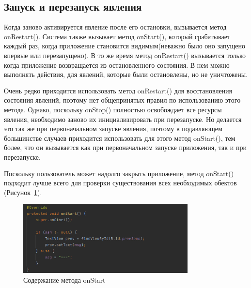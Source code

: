 \subsection{Запуск и перезапуск явления}
Когда заново активируется явление после его остановки, вызывается метод
onRestart(). Система также вызывает метод onStart(), который срабатывает
каждый раз, когда приложение становится видимым(неважно было оно
запущено впервые или перезапущено). В то же время метод onRestart()
вызывается только когда приложение возвращается из остановленного
состояния. В нем можно выполнять действия, для явлений, которые были
остановлены, но не уничтожены.\par
Очень редко приходится использовать метод onRestart() для восстановления
состояния явлений, поэтому нет общепринятых правил по использованию
этого метода. Однако, поскольку onStop() полностью освобождает все
ресурсы явления, необходимо заново их инициализировать при
перезапуске. Но делается это так же при первоначальном запуске явления,
поэтому в подавляющем большинстве случаев приходится использовать для
этого метод onStart(), тем более, что он вызывается как при первоначальном
запуске приложения, так и при перезапуске.\par
Поскольку пользователь может надолго закрыть приложение, метод
onStart() подходит лучше всего для проверки существования всех
необходимых обектов (Рисунок~\ref{fig:activity:onStart:content}).
\begin{figure}[h!tp]
	\centering
	\includegraphics[width=0.8\textwidth]{Screenshot from 2023-02-22 20-20-55.png}
	\caption{Содержание метода onStart}
	\label{fig:activity:onStart:content}
\end{figure}

